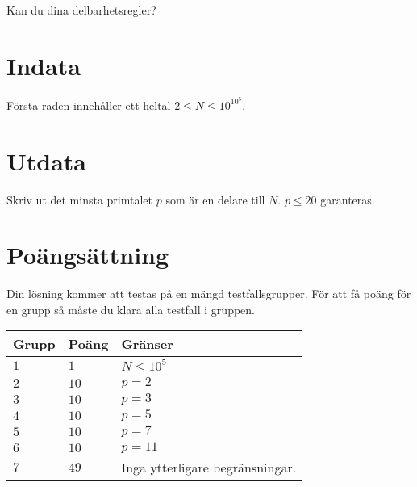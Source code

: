 \noindent
Kan du dina delbarhetsregler?

\noindent
\section*{Indata}
Första raden innehåller ett heltal $2 \leq N \leq 10^{10^5}$. 

\section*{Utdata}
Skriv ut det minsta primtalet $p$ som är en delare till $N$. $p \leq 20$ garanteras.

\section*{Poängsättning}
Din lösning kommer att testas på en mängd testfallsgrupper.
För att få poäng för en grupp så måste du klara alla testfall i gruppen.

\noindent
\begin{tabular}{| l | l | p{12cm} |}
  \hline
  \textbf{Grupp} & \textbf{Poäng} & \textbf{Gränser} \\ \hline
  $1$    & $1$          & $N \leq 10^5$  \\ \hline
  $2$    & $10$         & $p = 2$  \\ \hline
  $3$    & $10$         & $p = 3$  \\ \hline
  $4$    & $10$         & $p = 5$  \\ \hline
  $5$    & $10$         & $p = 7$  \\ \hline
  $6$    & $10$         & $p = 11$  \\ \hline
  $7$    & $49$         & Inga ytterligare begränsningar. \\ \hline
\end{tabular}
